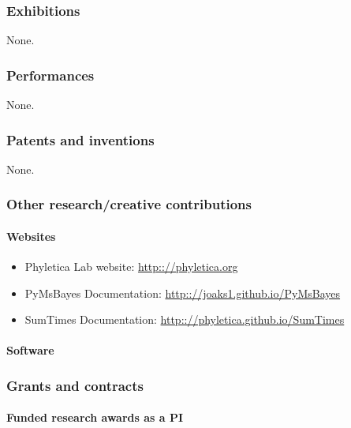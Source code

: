 
\subsubsection{Exhibitions}
None.

\subsubsection{Performances}
None.

\subsubsection{Patents and inventions}
None.

\subsubsection{Other research/creative contributions}
 
\paragraph{Websites}
\begin{itemize}
    \item Phyletica Lab website: \url{http:://phyletica.org}
    \item PyMsBayes Documentation: \url{http:://joaks1.github.io/PyMsBayes}
    \item SumTimes Documentation: \url{http:://phyletica.github.io/SumTimes}
\end{itemize}

\paragraph{Software}


\subsubsection{Grants and contracts}

\paragraph{Funded research awards as a PI}


